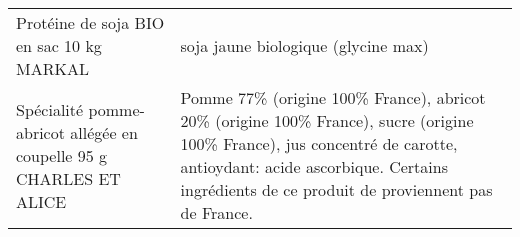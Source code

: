 \begin{longtable}{p{5cm}p{10cm}}
                                                                 Protéine de soja BIO en sac 10 kg MARKAL &                                                                                                                                                                                                                                                                                                                                                                                                                                                                                                                                                                                                                                                                                                                                                                                                                                                                                                                                                                                                      soja jaune biologique (glycine max) \\
                                       Spécialité pomme-abricot allégée en coupelle 95 g CHARLES ET ALICE &                                                                                                                                                                                                                                                                                                                                                                                                                                                                                                                                                                                                                                                                                                                                                                                                               Pomme 77\% (origine 100\% France), abricot 20\% (origine 100\% France), sucre (origine 100\% France), jus concentré de carotte, antioydant: acide ascorbique.  Certains ingrédients de ce produit de proviennent pas de France. \\

\end{longtable}
